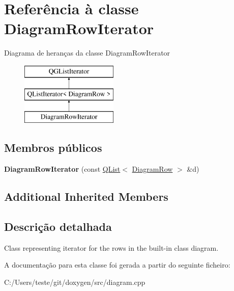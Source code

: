 \hypertarget{class_diagram_row_iterator}{\section{Referência à classe Diagram\-Row\-Iterator}
\label{class_diagram_row_iterator}
}
Diagrama de heranças da classe Diagram\-Row\-Iterator\begin{figure}[H]
\begin{center}
\leavevmode
\includegraphics[height=3.000000cm]{class_diagram_row_iterator}
\end{center}
\end{figure}
\subsection*{Membros públicos}
\begin{DoxyCompactItemize}
\item 
\hypertarget{class_diagram_row_iterator_adfd44cfe393b0e339d68ead7e3623f46}{{\bfseries Diagram\-Row\-Iterator} (const \hyperlink{class_q_list}{Q\-List}$<$ \hyperlink{class_diagram_row}{Diagram\-Row} $>$ \&d)}\label{class_diagram_row_iterator_adfd44cfe393b0e339d68ead7e3623f46}

\end{DoxyCompactItemize}
\subsection*{Additional Inherited Members}


\subsection{Descrição detalhada}
Class representing iterator for the rows in the built-\/in class diagram. 

A documentação para esta classe foi gerada a partir do seguinte ficheiro\-:\begin{DoxyCompactItemize}
\item 
C\-:/\-Users/teste/git/doxygen/src/diagram.\-cpp\end{DoxyCompactItemize}
